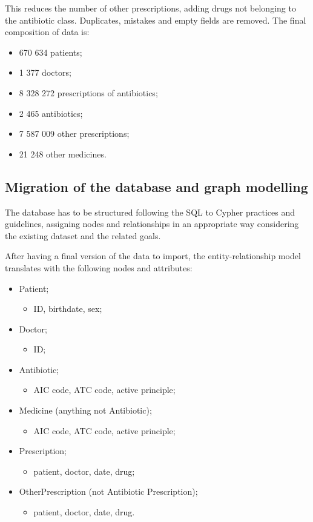 This reduces the number of other prescriptions, adding drugs not belonging to the antibiotic class. Duplicates, mistakes and empty fields are removed. The final composition of data is:

\begin{itemize}
	\item 670 634 patients;
	\item 1 377 doctors;
	\item 8 328 272 prescriptions of antibiotics;
	\item 2 465 antibiotics;
	\item 7 587 009 other prescriptions;
	\item 21 248 other medicines.
\end{itemize}


\subsection{Migration of the database and graph modelling}
The database has to be structured following the SQL to Cypher practices and guidelines, assigning nodes and relationships in an appropriate way considering the existing dataset and the related goals.

After having a final version of the data to import, the entity-relationship model translates with the following nodes and attributes:
\begin{itemize}
	\item Patient;
	\begin{itemize}
		\item ID, birthdate, sex;
	\end{itemize}
	\item Doctor;
	\begin{itemize}
		\item ID; %
	\end{itemize}
	\item Antibiotic;
	\begin{itemize}
		\item AIC code, ATC code, active principle;
	\end{itemize}
	\item Medicine (anything not Antibiotic);
	\begin{itemize}
		\item AIC code, ATC code, active principle;
	\end{itemize}
	\item Prescription;
	\begin{itemize}
		\item patient, doctor, date, drug;
	\end{itemize}
	\item OtherPrescription (not Antibiotic Prescription);
	\begin{itemize}
		\item patient, doctor, date, drug.
	\end{itemize}
\end{itemize}

